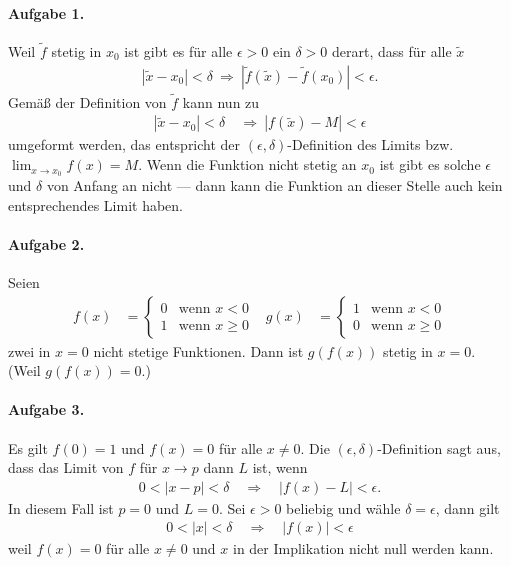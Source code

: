 \documentclass{article}
\begin{document}
\paragraph{Aufgabe 1.} Weil $\tilde{f}$ stetig in $x_0$ ist gibt es für alle $\epsilon > 0$ ein $\delta > 0$ derart, dass für alle $\tilde{x}$
\begin{align*}
    |\tilde{x} - x_0| < \delta\ \Rightarrow\ |\tilde{f}(\tilde{x}) - \tilde{f}(x_0)| < \epsilon.
\end{align*}
Gemäß der Definition von $\tilde{f}$ kann nun zu
\begin{align*}
    |\tilde{x} - x_0| < \delta\ &\Rightarrow\ |f(\tilde{x}) - M| < \epsilon
\end{align*}
umgeformt werden, das entspricht der $(\epsilon, \delta)$-Definition des Limits bzw. $\lim_{x \to x_0}f(x) = M$. Wenn die Funktion nicht stetig an $x_0$ ist gibt es solche $\epsilon$ und $\delta$ von Anfang an nicht --- dann kann die Funktion an dieser Stelle auch kein entsprechendes Limit haben. 


\paragraph{Aufgabe 2.} Seien
\begin{align*}
    f(x) &= \begin{cases}
        0 & \text{wenn $x < 0$} \\
        1 & \text{wenn $x \geq 0$}
    \end{cases}
    &
    g(x) &= \begin{cases}
        1 & \text{wenn $x < 0$} \\
        0 & \text{wenn $x \geq 0$}
    \end{cases}
\end{align*}
zwei in $x = 0$ nicht stetige Funktionen. Dann ist $g(f(x))$ stetig in $x = 0$. (Weil $g(f(x)) = 0$.)

\paragraph{Aufgabe 3.} Es gilt $f(0) = 1$ und $f(x) = 0$ für alle $x \neq 0$. Die $(\epsilon, \delta)$-Definition sagt aus, dass das Limit von $f$ für $x \to p$ dann $L$ ist, wenn
\begin{align*}
    0 < |x - p| < \delta \quad \Longrightarrow \quad |f(x) - L| < \epsilon.
\end{align*}
In diesem Fall ist $p = 0$ und $L = 0$. Sei $\epsilon > 0$ beliebig und wähle $\delta = \epsilon$, dann gilt
\begin{align*}
    0 < |x| < \delta \quad \Longrightarrow \quad |f(x)| < \epsilon
\end{align*}
weil $f(x) = 0$ für alle $x \neq 0$ und $x$ in der Implikation nicht null werden kann.
\end{document}
